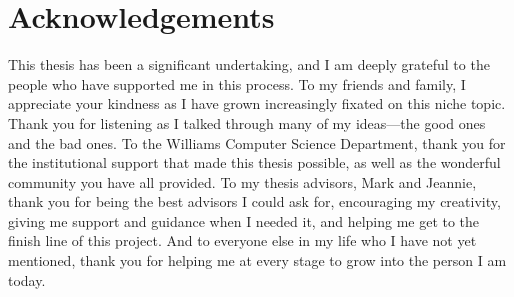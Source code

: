 \chapter*{Acknowledgements}
\label{chap:acknowledgements}

This thesis has been a significant undertaking, and I am deeply grateful to the people who have supported me in this process. To my friends and family, I appreciate your kindness as I have grown increasingly fixated on this niche topic. Thank you for listening as I talked through many of my ideas---the good ones and the bad ones. To the Williams Computer Science Department, thank you for the institutional support that made this thesis possible, as well as the wonderful community you have all provided. To my thesis advisors, Mark and Jeannie, thank you for being the best advisors I could ask for, encouraging my creativity, giving me support and guidance when I needed it, and helping me get to the finish line of this project. And to everyone else in my life who I have not yet mentioned, thank you for helping me at every stage to grow into the person I am today.